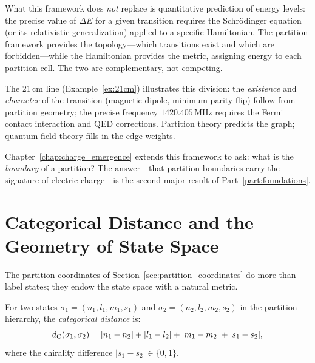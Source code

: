 What this framework does \emph{not} replace is quantitative prediction of energy
levels: the precise value of $\Delta E$ for a given transition requires the
Schr\"{o}dinger equation (or its relativistic generalization) applied to a
specific Hamiltonian. The partition framework provides the topology---which
transitions exist and which are forbidden---while the Hamiltonian provides
the metric, assigning energy to each partition cell. The two are complementary,
not competing.

The 21\,cm line (Example~\ref{ex:21cm}) illustrates this division: the
\emph{existence} and \emph{character} of the transition (magnetic dipole,
minimum parity flip) follow from partition geometry; the precise frequency
$1420.405\,\mathrm{MHz}$ requires the Fermi contact interaction and QED
corrections. Partition theory predicts the graph; quantum field theory fills
in the edge weights.

Chapter~\ref{chap:charge_emergence} extends this framework to ask: what
is the \emph{boundary} of a partition? The answer---that partition boundaries
carry the signature of electric charge---is the second major result of
Part~\ref{part:foundations}.

\section{Categorical Distance and the Geometry of State Space}
\label{sec:categorical_distance}

The partition coordinates of Section~\ref{sec:partition_coordinates} do more
than label states; they endow the state space with a natural metric.

\begin{definition}
\label{def:categorical_distance}
For two states $\sigma_1 = (n_1, l_1, m_1, s_1)$ and
$\sigma_2 = (n_2, l_2, m_2, s_2)$ in the partition hierarchy, the
\emph{categorical distance} is:
\begin{equation}
  d_{\mathrm{C}}(\sigma_1, \sigma_2) = |n_1 - n_2| + |l_1 - l_2| + |m_1 - m_2|
    + |s_1 - s_2|,
  \label{eq:categorical_distance}
\end{equation}
where the chirality difference $|s_1 - s_2| \in \{0, 1\}$.
\end{definition}

